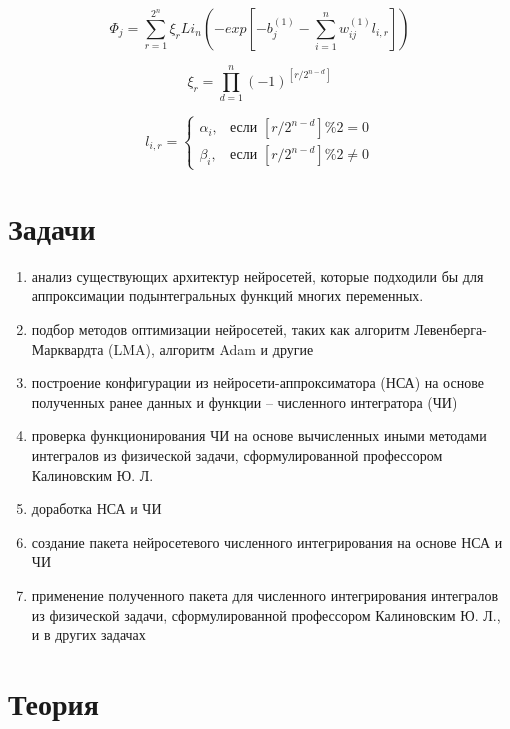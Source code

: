 \documentclass{article}
\begin{document}
\begin{equation}
    \Phi_j = \sum_{r=1}^{2^n}\xi_{r}Li_n(-exp[-b_j^{(1)} - \sum_{i=1}^{n}w_{ij}^{(1)}l_{i,r}])
\end{equation}

\begin{equation}
    \xi_{r} = \prod_{d=1}^{n}(-1)^{[{r}/{2^{n-d}}]}
\end{equation}

\begin{equation}
    l_{i,r} = \left\{
\begin{array}{ll}
\alpha_i, & \text{если } [{r}/{2^{n-d}}] \% 2 = 0 \\
\beta_i, & \text{если } [{r}/{2^{n-d}}] \% 2 \neq 0
\end{array}
\right.
\end{equation}

\section{Задачи}

\begin{enumerate}
    \item анализ существующих архитектур нейросетей, которые подходили бы для аппроксимации подынтегральных функций многих переменных.
    \item подбор методов оптимизации нейросетей, таких как алгоритм Левенберга-Марквардта (LMA), алгоритм Adam и другие
    \item построение конфигурации из нейросети-аппроксиматора (НСА) на основе полученных ранее данных и функции – численного интегратора (ЧИ)
    \item проверка функционирования ЧИ на основе вычисленных иными методами интегралов из физической задачи, сформулированной профессором Калиновским Ю. Л.
    \item доработка НСА и ЧИ
    \item создание пакета нейросетевого численного интегрирования на основе НСА и ЧИ
    \item применение полученного пакета для численного интегрирования интегралов из физической задачи, сформулированной профессором Калиновским Ю. Л., и в других задачах
\end{enumerate}



\section{Теория}
\end{document}
